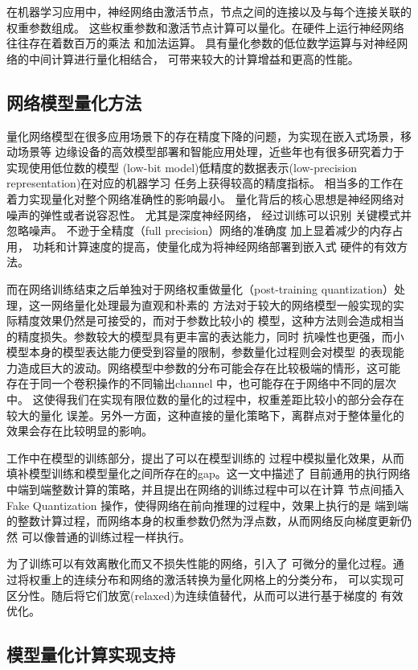 在机器学习应用中，神经网络由激活节点，节点之间的连接以及与每个连接关联的权重参数组成。
这些权重参数和激活节点计算可以量化。在硬件上运行神经网络往往存在着数百万的乘法
和加法运算。 具有量化参数的低位数学运算与对神经网络的中间计算进行量化相结合，
可带来较大的计算增益和更高的性能。

\subsection{网络模型量化方法}
量化网络模型在很多应用场景下的存在精度下降的问题，为实现在嵌入式场景，移动场景等
边缘设备的高效模型部署和智能应用处理，近些年也有很多研究着力于实现使用低位数的模型
(low-bit model)低精度的数据表示(low-precision representation)在对应的机器学习
任务上获得较高的精度指标。 相当多的工作在着力实现量化对整个网络准确性的影响最小。
量化背后的核心思想是神经网络对噪声的弹性或者说容忍性。 尤其是深度神经网络，
经过训练可以识别 关键模式并忽略噪声。 不逊于全精度（full precision）网络的准确度
加上显着减少的内存占用， 功耗和计算速度的提高，使量化成为将神经网络部署到嵌入式
硬件的有效方法。

而在网络训练结束之后单独对于网络权重做量化（post-training quantization）处理，这一网络量化处理最为直观和朴素的
方法对于较大的网络模型一般实现的实际精度效果仍然是可接受的，而对于参数比较小的
模型，这种方法则会造成相当的精度损失。参数较大的模型具有更丰富的表达能力，同时
抗噪性也更强，而小模型本身的模型表达能力便受到容量的限制，参数量化过程则会对模型
的表现能力造成巨大的波动。网络模型中参数的分布可能会存在比较极端的情形，这可能
存在于同一个卷积操作的不同输出channel 中，也可能存在于网络中不同的层次中。
这使得我们在实现有限位数的量化的过程中，权重差距比较小的部分会存在较大的量化
误差。另外一方面，这种直接的量化策略下，离群点对于整体量化的效果会存在比较明显的影响。

工作\cite{Jacob2017QuantizationAT}中在模型的训练部分，提出了可以在模型训练的
过程中模拟量化效果，从而填补模型训练和模型量化之间所存在的gap。这一文中描述了
目前通用的执行网络中端到端整数计算的策略，并且提出在网络的训练过程中可以在计算
节点间插入 Fake Quantization 操作，使得网络在前向推理的过程中，效果上执行的是
端到端的整数计算过程，而网络本身的权重参数仍然为浮点数，从而网络反向梯度更新仍然
可以像普通的训练过程一样执行。

\cite{Louizos2019RelaxedQF} 为了训练可以有效离散化而又不损失性能的网络，引入了
可微分的量化过程。通过将权重上的连续分布和网络的激活转换为量化网格上的分类分布，
可以实现可区分性。随后将它们放宽(relaxed)为连续值替代，从而可以进行基于梯度的
有效优化。

\subsection{模型量化计算实现支持}


